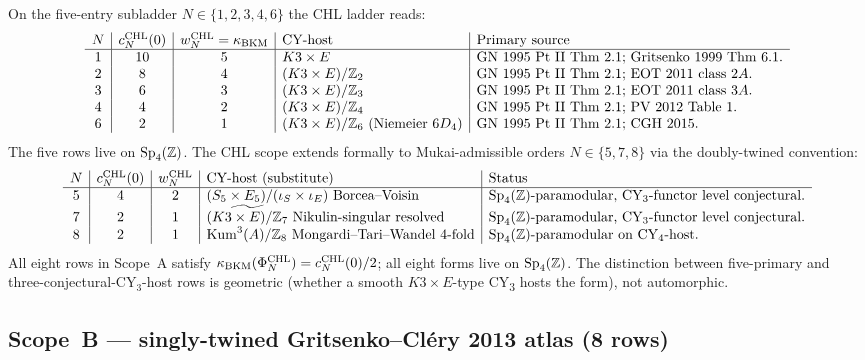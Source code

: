 On the five-entry subladder $N \in \{1, 2, 3, 4, 6\}$ the CHL ladder
reads:
\[
\begin{array}{c|c|c|l|l}
 N & c_N^{\mathrm{CHL}}(0) & w_N^{\mathrm{CHL}} = \kappa_{\mathrm{BKM}} & \text{CY-host} & \text{Primary source} \\ \hline
 1 & 10 & 5 & K3 \times E &
    \text{GN 1995 Pt~II Thm~2.1; Gritsenko 1999 Thm~6.1.} \\
 2 & 8 & 4 & (K3 \times E)/\mathbb Z_2 &
    \text{GN 1995 Pt~II Thm~2.1; EOT 2011 class $2A$.} \\
 3 & 6 & 3 & (K3 \times E)/\mathbb Z_3 &
    \text{GN 1995 Pt~II Thm~2.1; EOT 2011 class $3A$.} \\
 4 & 4 & 2 & (K3 \times E)/\mathbb Z_4 &
    \text{GN 1995 Pt~II Thm~2.1; PV 2012 Table~1.} \\
 6 & 2 & 1 & (K3 \times E)/\mathbb Z_6\ \text{(Niemeier $6 D_4$)} &
    \text{GN 1995 Pt~II Thm~2.1; CGH 2015.} \\
\end{array}
\]
The five rows live on $\mathrm{Sp}_4(\mathbb Z)$. The CHL scope extends formally to
Mukai-admissible orders $N \in \{5, 7, 8\}$ via the doubly-twined
convention:
\[
\begin{array}{c|c|c|l|l}
 N & c_N^{\mathrm{CHL}}(0) & w_N^{\mathrm{CHL}} & \text{CY-host (substitute)} & \text{Status} \\ \hline
 5 & 4 & 2 & (S_5 \times E_5)/(\iota_S \times \iota_E)\ \text{Borcea--Voisin} &
   \text{$\SpFour$-paramodular, CY\textsubscript{3}-functor level conjectural.} \\
 7 & 2 & 1 & \widetilde{(K3 \times E)/\mathbb Z_7}\ \text{Nikulin-singular resolved} &
   \text{$\SpFour$-paramodular, CY\textsubscript{3}-functor level conjectural.} \\
 8 & 2 & 1 & \mathrm{Kum}^3(A)/\mathbb Z_8\ \text{Mongardi--Tari--Wandel 4-fold} &
   \text{$\SpFour$-paramodular on CY\textsubscript{4}-host.} \\
\end{array}
\]
All eight rows in Scope~A satisfy $\kappa_{\mathrm{BKM}}(\Phi_N^{\mathrm{CHL}}) =
c_N^{\mathrm{CHL}}(0)/2$; all eight forms live on $\mathrm{Sp}_4(\mathbb Z)$. The
distinction between five-primary and three-conjectural-CY$_3$-host
rows is geometric (whether a smooth $K3 \times E$-type CY\textsubscript{3}
hosts the form), not automorphic.

\subsection*{Scope~B --- singly-twined Gritsenko--Cl\'ery 2013 atlas (8 rows)}

